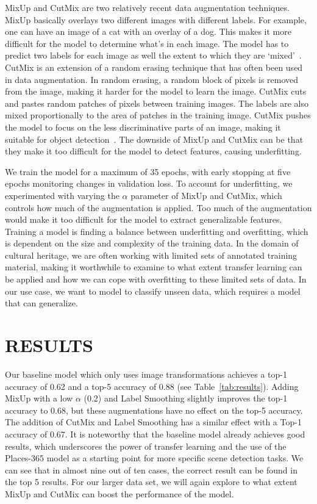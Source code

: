 \documentclass[a4paper,twoside]{article}
\begin{document}
MixUp and CutMix are two relatively recent data augmentation techniques. 
MixUp basically overlays two different images with different labels. 
For example, one can have an image of a cat with an overlay of a dog. 
This makes it more difficult for the model to determine what's in each image. 
The model has to predict two labels for each image as well the extent to which they are `mixed'~\cite{zhangMixupEmpiricalRisk2018}. 
%
CutMix is an extension of a random erasing technique that has often been used in data augmentation. 
In random erasing, a random block of pixels is removed from the image, making it harder for the model to learn the image. 
CutMix cuts and pastes random patches of pixels between training images. 
The labels are also mixed proportionally to the area of patches in the training image. 
CutMix pushes the model to focus on the less discriminative parts of an image, making it suitable for object detection~\cite{yunCutMixRegularizationStrategy2019}.
The downside of MixUp and CutMix can be that they make it too difficult for the model to detect features, causing underfitting. 

We train the model for a maximum of 35 epochs, with early stopping at five epochs monitoring changes in validation loss. 
To account for underfitting, we experimented with varying the $\alpha$ parameter of MixUp and CutMix, which controls how much of the augmentation is applied. 
Too much of the augmentation would make it too difficult for the model to extract generalizable features. 
Training a model is finding a balance between underfitting and overfitting, which is dependent on the size and complexity of the training data. 
In the domain of cultural heritage, we are often working with limited sets of annotated training material, making it worthwhile to examine to what extent transfer learning can be applied and how we can cope with overfitting to these limited sets of data. 
In our use case, we want to model to classify unseen data, which requires a model that can generalize.

\section{RESULTS}
\noindent Our baseline model which only uses image transformations achieves a top-1 accuracy of 0.62 and a top-5 accuracy of 0.88 (see Table~\ref{tab:results}). 
Adding MixUp with a low $\alpha$ (0.2) and Label Smoothing slightly improves the top-1 accuracy to 0.68, but these augmentations have no effect on the top-5 accuracy. 
The addition of CutMix and Label Smoothing has a similar effect with a Top-1 accuracy of 0.67. 
It is noteworthy that the baseline model already achieves good results, which underscores the power of transfer learning and the use of the Places-365 model as a starting point for more specific scene detection tasks. 
We can see that in almost nine out of ten cases, the correct result can be found in the top 5 results. 
For our larger data set, we will again explore to what extent MixUp and CutMix can boost the performance of the model.
\end{document}
